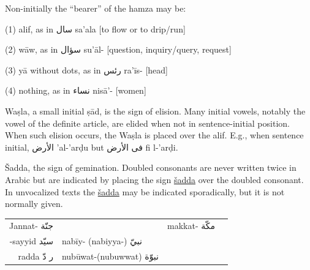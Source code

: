 \documentclass{article}
\newcommand{\ar}[1]{{\arabicfont #1}}
\begin{document}
\begin{center}
Non-initially the ``bearer'' of the hamza may be:

\vspace{0.5em}

(1) alif, as in \ar{سال} sa'ala [to flow or to drip/run]

\vspace{0.5em}

(2) w\={a}w, as in \ar{سؤال} su'\={a}l- [question, inquiry/query, request]

\vspace{0.5em}

(3) y\={a} without dots, as in \ar{رئس} ra'\={i}s- [head]

\vspace{0.5em}

(4) nothing, as in \ar{نساء} nis\={a}'- [women]
\end{center}


\vspace{1.5em}

Wa\d{s}la, a small initial \d{s}\={a}d, is the sign of elision. Many initial vowels, notably the vowel
of the definite article, are elided when not in sentence-initial position. When such
elision occurs, the Wa\d{s}la is placed over the alif. E.g., when sentence initial, \ar{الأرض} 'al-'ar\d{d}u but \ar{فى الأرض} fi l-'ar\d{d}i.

\vspace{1.5em}

\v{S}adda, the sign of gemination. Doubled consonants are never written twice in Arabic
but are indicated by placing the sign \underline{\v{s}adda} over the doubled consonant. In unvocalized
texts the \underline{\v{s}adda} may be indicated sporadically, but it is not normally given.

\vspace{1em}

\begin{center}
\begin{tabular}{r l r l}
Jannat- \ar{جنّة}  & & makkat- \ar{مكّة}          \\[6pt]
-sayyid \ar{سيّد}  & nab\={i}y- (nabiyya-) \ar{نبيّ} \\[6pt]
radda \ar{ر دّ}    & nub\={u}wat-(nubuwwat) \ar{نبوّة} \\[6pt]
\end{tabular}
\end{center}


\vspace{1.5em}
\end{document}
